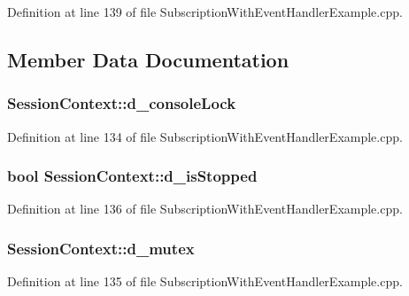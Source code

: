 Definition at line 139 of file Subscription\+With\+Event\+Handler\+Example.\+cpp.



\subsection{Member Data Documentation}
\subsubsection[{\texorpdfstring{d\+\_\+console\+Lock}{d_consoleLock}}]{ Session\+Context\+::d\+\_\+console\+Lock}\hypertarget{struct_session_context_a25709be2c1f099ec19736f5a29eab867}{}\label{struct_session_context_a25709be2c1f099ec19736f5a29eab867}


Definition at line 134 of file Subscription\+With\+Event\+Handler\+Example.\+cpp.

\subsubsection[{\texorpdfstring{d\+\_\+is\+Stopped}{d_isStopped}}]{\setlength{\rightskip}{0pt plus 5cm}bool Session\+Context\+::d\+\_\+is\+Stopped}\hypertarget{struct_session_context_a8321cad798024b2c3e51aa7a8c755b47}{}\label{struct_session_context_a8321cad798024b2c3e51aa7a8c755b47}


Definition at line 136 of file Subscription\+With\+Event\+Handler\+Example.\+cpp.

\subsubsection[{\texorpdfstring{d\+\_\+mutex}{d_mutex}}]{ Session\+Context\+::d\+\_\+mutex}\hypertarget{struct_session_context_a4a24a16ebeb54d3dc1655d2a4af50770}{}\label{struct_session_context_a4a24a16ebeb54d3dc1655d2a4af50770}


Definition at line 135 of file Subscription\+With\+Event\+Handler\+Example.\+cpp.

